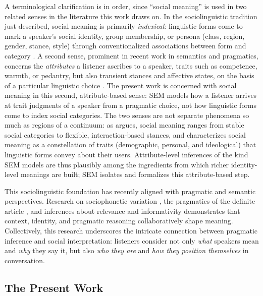 \documentclass[12pt,a4paper]{article}
\begin{document}
A terminological clarification is in order, since ``social meaning'' is used in
two related senses in the literature this work draws on. In the sociolinguistic
tradition just described, social meaning is primarily \emph{indexical}:
linguistic forms come to mark a speaker's social identity, group membership, or
persona (class, region, gender, stance, style) through conventionalized
associations between form and category \citep{Eckert2008,Podesva2011,Silverstein2003}.
A second sense, prominent in recent work in semantics and pragmatics, concerns
the \emph{attributes} a listener ascribes to a speaker, traits such as
competence, warmth, or pedantry, but also transient stances and affective
states, on the basis of a particular linguistic choice
\citep{beltrama2020,beltramastaumcasasanto2021}. The present work is concerned
with social meaning in this second, attribute-based sense: SEM models how a
listener arrives at trait judgments of a speaker from a pragmatic choice, not how
linguistic forms come to index social categories. The two senses are not
separate phenomena so much as regions of a continuum: as \citet{Eckert2019}
argues, social meaning ranges from stable social categories to flexible,
interaction-based stances, and \citet{beltrama2020} characterizes social meaning
as a constellation of traits (demographic, personal, and ideological) that
linguistic forms convey about their users. Attribute-level inferences of the kind
SEM models are thus plausibly among the ingredients from which richer
identity-level meanings are built; SEM isolates and formalizes this
attribute-based step.

This sociolinguistic foundation has recently aligned with pragmatic and semantic
perspectives. Research on sociophonetic variation \citep{burnett2017,burnett2019,burnett2023,burnett2025},
the pragmatics of the definite article \citep{Acton2019}, and inferences about
relevance and informativity \citep{beltramapapafragou2023} demonstrates that
context, identity, and pragmatic reasoning collaboratively shape meaning.
Collectively, this research underscores the intricate connection between
pragmatic inference and social interpretation: listeners consider not only
\emph{what} speakers mean and \emph{why} they say it, but also \emph{who they
are} and \emph{how they position themselves} in conversation.

\subsection{The Present Work}
\end{document}
